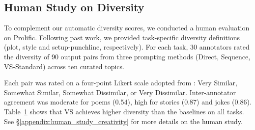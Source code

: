 \subsection{Human Study on Diversity}
To complement our automatic diversity scores, we conducted a human evaluation on Prolific. Following past work, we provided task-specific diversity definitions (plot, style and setup-punchline, respectively). 
For each task, 30 annotators rated the diversity of 90 output pairs from three prompting methods (Direct, Sequence, VS-Standard)  across ten curated topics. 
\begin{figure}
\vspace{-1em}
    \label{tab:human_study_diversity}
    \vspace{-2em}
\end{figure}
Each pair was rated on a four-point Likert scale adopted from \citet{chen-etal-2022-semeval}: Very Similar, Somewhat Similar, Somewhat Dissimilar, or Very Dissimilar. Inter-annotator agreement was moderate for poems (0.54), high for stories (0.87) and jokes (0.86). 
Table~\ref{tab:human_study_diversity} shows that VS achieves higher diversity than the baselines on all tasks.
See \S\ref{appendix:human_study_creativity} for more details on the human study.




